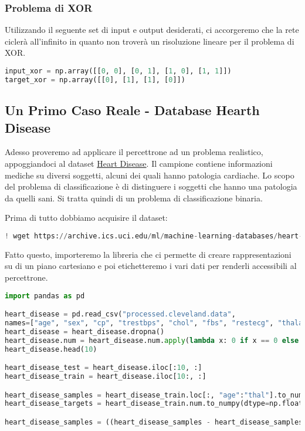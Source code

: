 \subsubsection{Problema di XOR}
Utilizzando il seguente set di input e output desiderati, ci accorgeremo che la rete ciclerà all'infinito in quanto non troverà un risoluzione lineare per il problema di XOR.
\begin{lstlisting}[language=Python, caption=Inizializzazione]
input_xor = np.array([[0, 0], [0, 1], [1, 0], [1, 1]])
target_xor = np.array([[0], [1], [1], [0]])    
\end{lstlisting}

\subsection{Un Primo Caso Reale - Database Hearth Disease}
Adesso proveremo ad applicare il percettrone ad un problema realistico, appoggiandoci al dataset \href{https://archive.ics.uci.edu/ml/datasets/Heart+Disease}{Heart Disease}. Il campione contiene informazioni mediche su diversi soggetti, alcuni dei quali hanno patologia cardiache. Lo scopo del problema di classificazione è di distinguere i soggetti che hanno una patologia da quelli sani. Si tratta quindi di un problema di classificazione binaria.

Prima di tutto dobbiamo acquisire il dataset:

\begin{lstlisting}[language=Python, caption=Acquisizione del Dataset]
! wget https://archive.ics.uci.edu/ml/machine-learning-databases/heart-disease/processed.cleveland.data
\end{lstlisting}

Fatto questo, importeremo la libreria che ci permette di creare rappresentazioni su di un piano cartesiano e poi etichetteremo i vari dati per renderli accessibili al percettrone.

\begin{lstlisting}[language=Python, caption=Importazione Libreria Grafica e Labelling]
import pandas as pd

heart_disease = pd.read_csv("processed.cleveland.data",
names=["age", "sex", "cp", "trestbps", "chol", "fbs", "restecg", "thalach", "exang", "oldpeak", "slope", "ca", "thal", "num"], na_values='?')
heart_disease = heart_disease.dropna()
heart_disease.num = heart_disease.num.apply(lambda x: 0 if x == 0 else 1)
heart_disease.head(10)

heart_disease_test = heart_disease.iloc[:10, :]
heart_disease_train = heart_disease.iloc[10:, :]

heart_disease_samples = heart_disease_train.loc[:, "age":"thal"].to_numpy()
heart_disease_targets = heart_disease_train.num.to_numpy(dtype=np.float64)

heart_disease_samples = ((heart_disease_samples - heart_disease_samples.mean(axis=0)) / heart_disease_samples.std(axis=0))
\end{lstlisting}

